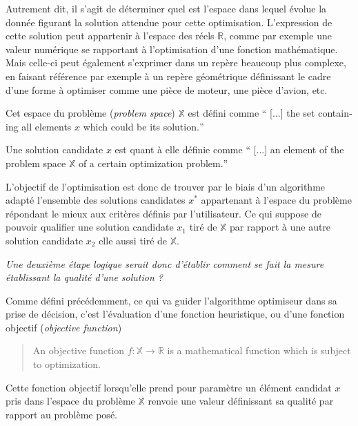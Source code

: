 Autrement dit, il s'agit de déterminer quel est l'espace dans lequel évolue la donnée figurant la solution attendue pour cette optimisation. L'expression de cette solution peut appartenir à l'espace des réels $\mathbb{R}$, comme par exemple une valeur numérique se rapportant à l'optimisation d'une fonction mathématique. Mais celle-ci peut également s'exprimer dans un repère beaucoup plus complexe, en faisant référence par exemple à un repère géométrique définissant le cadre  d'une forme à optimiser comme une pièce de moteur, une pièce d'avion, etc. \autocite[43]{Weise2011}
\medskip

Cet espace du problème (\textit{problem space}) $\mathbb{X}$ est défini comme \foreignquote{english}{ [...] the set containing all elements $x$ which could be its solution.}

\medskip

Une solution candidate $x$ est quant à elle définie comme \foreignquote{english}{ [...] an element of the problem space $ \mathbb{X}$ of a certain optimization problem.}

\medskip

L'objectif de l'optimisation est donc de trouver par le biais d'un algorithme adapté l'ensemble des solutions candidates $x^*$ appartenant à l'espace du problème répondant le mieux aux critères définis par l'utilisateur. Ce qui suppose de pouvoir qualifier une solution candidate $x_1$ tiré de $\mathbb{X}$ par rapport à une autre solution candidate $x_2$ elle aussi tiré de $\mathbb{X}$.

\medskip

\textit{Une deuxième étape logique serait donc d'établir comment se fait la mesure établissant la qualité d'une solution ?}

\medskip

Comme défini précédemment, ce qui va guider l'algorithme optimiseur dans sa prise de décision, c'est l'évaluation d'une fonction heuristique, ou d'une fonction objectif (\textit{objective function}) 

\medskip

\foreignblockquote{english}{An objective function $f: \mathbb{X} \to \mathbb{R}$ is a mathematical function which is subject to optimization.}

\medskip

Cette fonction objectif lorsqu'elle prend pour paramètre un élément candidat $x$ pris dans l'espace du problème $ \mathbb{X}$ renvoie une valeur définissant sa qualité par rapport au problème posé. \autocite[44]{Weise2011}

